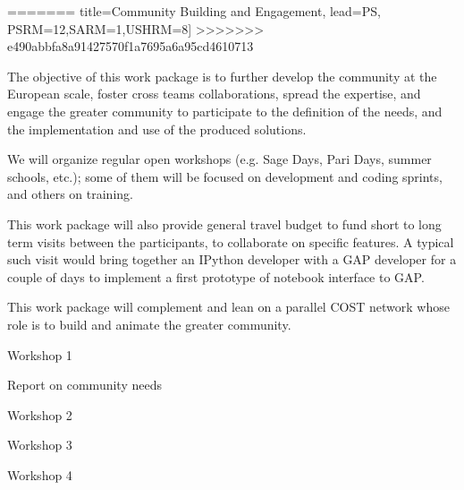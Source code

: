 \begin{workpackage}[id=community,wphases=5-36!.7,
<<<<<<< HEAD
title=Community Building and Engagement,
SARM=1,USHRM=8]
=======
  title=Community Building and Engagement,
  lead=PS,
  PSRM=12,SARM=1,USHRM=8]
>>>>>>> e490abbfa8a91427570f1a7695a6a95cd4610713

\begin{wpobjectives}
  The objective of this work package is to further develop the community at the
  European scale, foster cross teams collaborations, spread the
  expertise, and engage the greater community to participate to the
  definition of the needs, and the implementation and use of the
  produced solutions.
\end{wpobjectives}

\begin{wpdescription}
  We will organize regular open workshops (e.g. Sage Days, Pari Days,
  summer schools, etc.); some of them will be focused on development
  and coding sprints, and others on training.


  This work package will also provide general travel budget to fund
  short to long term visits between the participants, to collaborate
  on specific features. A typical such visit would bring together an
  IPython developer with a GAP developer for a couple of days to
  implement a first prototype of notebook interface to GAP.

  This work package will complement and lean on a parallel COST
  network whose role is to build and animate the greater community.


\end{wpdescription}

\begin{wpdelivs}
  \begin{wpdeliv}[due=6,id=ws1,dissem=PU,nature=O]{Workshop 1}
  \end{wpdeliv}
  \begin{wpdeliv}[due=12,id=needs,dissem=PU,nature=R]{Report on community needs}
  \end{wpdeliv}
  \begin{wpdeliv}[due=18,id=ws2,dissem=PU,nature=O]{Workshop 2}
  \end{wpdeliv}
  \begin{wpdeliv}[due=30,id=ws3,dissem=PU,nature=O]{Workshop 3}
  \end{wpdeliv}
  \begin{wpdeliv}[due=42,id=ws4,dissem=PU,nature=O]{Workshop 4}
  \end{wpdeliv}
\end{wpdelivs}
\end{workpackage}
